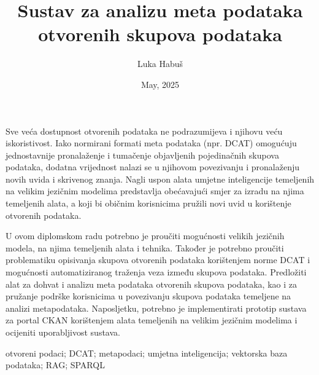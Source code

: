 \documentclass[diplomskirad]{fer}
\title{Sustav za analizu meta podataka otvorenih skupova podataka}
\author{Luka Habuš}
\date{May, 2025}
\begin{document}
\maketitle



\begin{zahvale}
\end{zahvale}

\mainmatter

\tableofcontents











\begin{sazetak}
Sve veća dostupnost otvorenih podataka ne podrazumijeva i njihovu veću iskoristivost. Iako normirani formati meta podataka (npr. DCAT) omogućuju jednostavnije pronalaženje i tumačenje objavljenih pojedinačnih skupova podataka, dodatna vrijednost nalazi se u njihovom povezivanju i pronalaženju novih uvida i skrivenog znanja. Nagli uspon alata umjetne inteligencije temeljenih na velikim jezičnim modelima predstavlja obećavajući smjer za izradu na njima temeljenih alata, a koji bi običnim korisnicima pružili novi uvid u korištenje otvorenih podataka.

U ovom diplomskom radu potrebno je proučiti mogućnosti velikih jezičnih modela, na njima temeljenih alata i tehnika. Također je potrebno proučiti problematiku opisivanja skupova otvorenih podataka korištenjem norme DCAT i mogućnosti automatiziranog traženja veza između skupova podataka. Predložiti alat za dohvat i analizu meta podataka otvorenih skupova podataka, kao i za pružanje podrške korisnicima u povezivanju skupova podataka temeljene na analizi metapodataka. Naposljetku, potrebno je implementirati prototip sustava za portal CKAN korištenjem alata temeljenih na velikim jezičnim modelima i ocijeniti uporabljivost sustava.
\end{sazetak}

\begin{kljucnerijeci}
    otvoreni podaci; DCAT; metapodaci; umjetna inteligencija; vektorska baza podataka; RAG; SPARQL
\end{kljucnerijeci}
\end{document}
